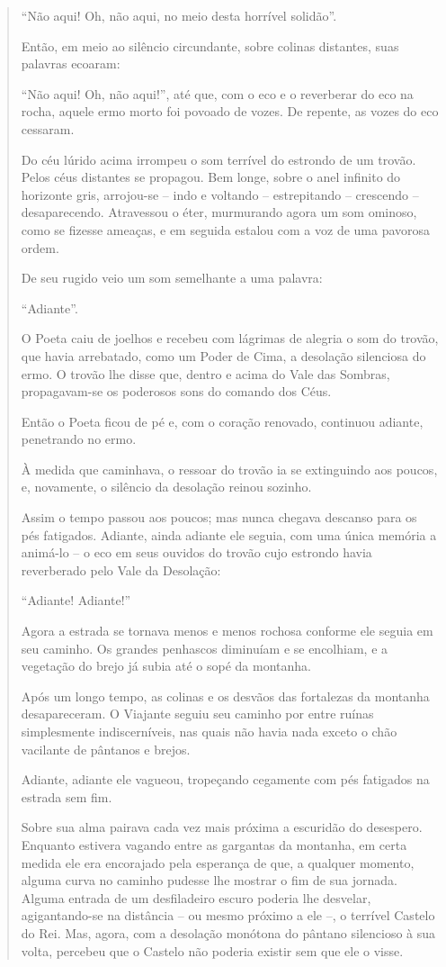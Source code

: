 \begin{verse}
``Não aqui! Oh, não aqui, no meio desta horrível solidão''.

Então, em meio ao silêncio circundante, sobre colinas distantes, suas
palavras ecoaram:

``Não aqui! Oh, não aqui!'', até que, com o eco e o reverberar do eco na
rocha, aquele ermo morto foi povoado de vozes.
\smallskip
De repente, as vozes do eco cessaram.

Do céu lúrido acima irrompeu o som terrível do estrondo de um trovão.
Pelos céus distantes se propagou. Bem longe, sobre o anel infinito do
horizonte gris, arrojou-se -- indo e voltando -- estrepitando --
crescendo -- desaparecendo. Atravessou o éter, murmurando agora um som
ominoso, como se fizesse ameaças, e em seguida estalou com a voz de uma
pavorosa ordem.

De seu rugido veio um som semelhante a uma palavra:

``Adiante''.

O Poeta caiu de joelhos e recebeu com lágrimas de alegria o som do
trovão, que havia arrebatado, como um Poder de Cima, a desolação
silenciosa do ermo. O trovão lhe disse que, dentro e acima do Vale das
Sombras, propagavam-se os poderosos sons do comando dos Céus.

Então o Poeta ficou de pé e, com o coração renovado, continuou adiante,
penetrando no ermo.

À medida que caminhava, o ressoar do trovão ia se extinguindo aos
poucos, e, novamente, o silêncio da desolação reinou sozinho.

Assim o tempo passou aos poucos; mas nunca chegava descanso para os pés
fatigados. Adiante, ainda adiante ele seguia, com uma única memória a
animá-lo -- o eco em seus ouvidos do trovão cujo estrondo havia
reverberado pelo Vale da Desolação:

``Adiante! Adiante!''

Agora a estrada se tornava menos e menos rochosa conforme ele seguia em
seu caminho. Os grandes penhascos diminuíam e se encolhiam, e a
vegetação do brejo já subia até o sopé da montanha.

Após um longo tempo, as colinas e os desvãos das fortalezas da montanha
desapareceram. O Viajante seguiu seu caminho por entre ruínas
simplesmente indiscerníveis, nas quais não havia nada exceto o chão
vacilante de pântanos e brejos.

Adiante, adiante ele vagueou, tropeçando cegamente com pés fatigados na
estrada sem fim.

Sobre sua alma pairava cada vez mais próxima a escuridão do desespero.
Enquanto estivera vagando entre as gargantas da montanha, em certa
medida ele era encorajado pela esperança de que, a qualquer momento,
alguma curva no caminho pudesse lhe mostrar o fim de sua jornada. Alguma
entrada de um desfiladeiro escuro poderia lhe desvelar, agigantando-se
na distância -- ou mesmo próximo a ele --, o terrível Castelo do Rei.
Mas, agora, com a desolação monótona do pântano silencioso à sua volta,
percebeu que o Castelo não poderia existir sem que ele o visse.


\end{verse}
